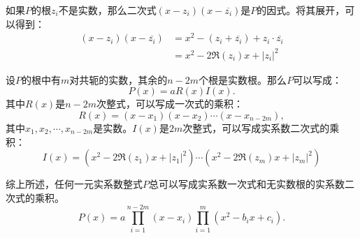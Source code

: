 \documentclass[12pt,UTF8]{ctexbook}
\theoremstyle{definition}
\theoremstyle{plain}
\begin{document}
\begin{appendix}
如果$P$的根$z_i$不是实数，那么二次式$(x - z_i)(x - \overline{z_i})$是$P$的因式。将其展开，可以得到：
\begin{align*}
    (x - z_i)(x - \overline{z_i}) &= x^2 - (z_i + \overline{z_i}) + z_i\cdot\overline{z_i} \\
    &= x^2 - 2\Re(z_i)x + |z_i|^2
\end{align*}

设$P$的根中有$m$对共轭的实数，其余的$n-2m$个根是实数根。那么$P$可以写成：
$$ P(x) = aR(x)I(x).$$
其中$R(x)$是$n-2m$次整式，可以写成一次式的乘积：
$$ R(x) = (x - x_1)(x - x_2)\cdots(x - x_{n-2m}), $$
其中$x_1, x_2, \cdots, x_{n-2m}$是实数。$I(x)$是$2m$次整式，可以写成实系数二次式的乘积：
$$ I(x) = (x^2 - 2\Re(z_1)x + |z_1|^2) \cdots (x^2 - 2\Re(z_m)x + |z_m|^2)$$

综上所述，任何一元实系数整式$P$总可以写成实系数一次式和无实数根的实系数二次式的乘积。
$$ P(x) = a\prod_{i=1}^{n-2m}(x - x_i) \prod_{i=1}^m (x^2 - b_ix + c_i). $$


\end{appendix}
\end{document}
